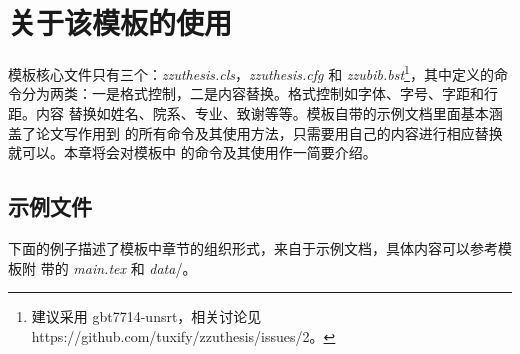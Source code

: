 \chapter{关于该模板的使用}
\label{cha:usage}

模板核心文件只有三个：\emph{zzuthesis.cls}，\emph{zzuthesis.cfg} 和
\emph{zzubib.bst}\footnote{建议采用 gbt7714-unsrt，相关讨论见
https://github.com/tuxify/zzuthesis/issues/2。}，其中定义的命
令分为两类：一是格式控制，二是内容替换。格式控制如字体、字号、字距和行距。内容
替换如姓名、院系、专业、致谢等等。模板自带的示例文档里面基本涵盖了论文写作用到
的所有命令及其使用方法，只需要用自己的内容进行相应替换就可以。本章将会对模板中
的命令及其使用作一简要介绍。

\section{\zzuthesis{} 示例文件}

下面的例子描述了模板中章节的组织形式，来自于示例文档，具体内容可以参考模板附
带的 \emph{main.tex} 和 \emph{data}\//。
\begin{code}

\frontmatter
\makecover


\tableofcontents%
\listoffigures%
\listoftables%
\end{code}
\begin{code}
\mainmatter


\end{code}
\begin{code}
\backmatter




\begin{appendix}%
  
  
\end{appendix}



\end{code}

